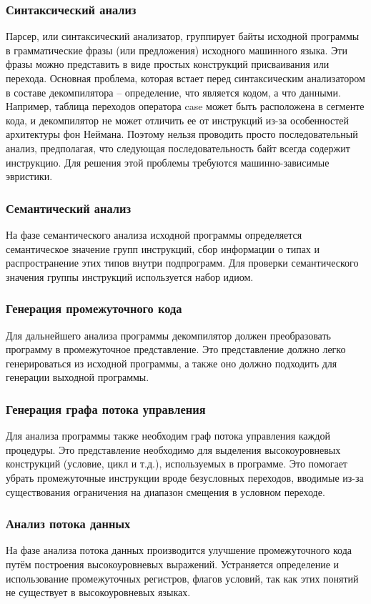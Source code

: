 \subsubsection*{Синтаксический анализ} 
Парсер, или синтаксический анализатор, группирует байты исходной программы в грамматические фразы (или предложения) исходного машинного языка. Эти фразы можно представить в виде простых конструкций присваивания или перехода.
Основная проблема, которая встает перед синтаксическим анализатором в составе декомпилятора – определение, что является кодом, а что данными. Например, таблица переходов оператора case может быть расположена в сегменте кода, и декомпилятор не может отличить ее от инструкций из-за особенностей архитектуры фон Неймана. Поэтому нельзя проводить просто последовательный анализ, предполагая, что следующая последовательность байт всегда содержит инструкцию. Для решения этой проблемы требуются машинно-зависимые эвристики.
\subsubsection*{Семантический анализ}
На фазе семантического анализа исходной программы определяется семантическое значение групп инструкций, сбор информации о типах и распространение этих типов внутри подпрограмм. Для проверки семантического значения группы инструкций используется набор идиом.
\subsubsection*{Генерация промежуточного кода} 
Для дальнейшего анализа программы декомпилятор должен преобразовать программу в промежуточное представление. Это представление должно легко генерироваться из исходной программы, а также оно должно подходить для генерации выходной программы.
\subsubsection*{Генерация графа потока управления}
Для анализа программы также необходим граф потока управления каждой процедуры. Это представление необходимо для выделения высокоуровневых конструкций (условие, цикл и т.д.), используемых в программе. Это помогает убрать промежуточные инструкции вроде безусловных переходов, вводимые из-за существования ограничения на диапазон смещения в условном переходе.
\subsubsection*{Анализ потока данных} 
На фазе анализа потока данных производится улучшение промежуточного кода путём построения высокоуровневых выражений. Устраняется определение и использование промежуточных регистров, флагов условий, так как этих понятий не существует в высокоуровневых языках.
